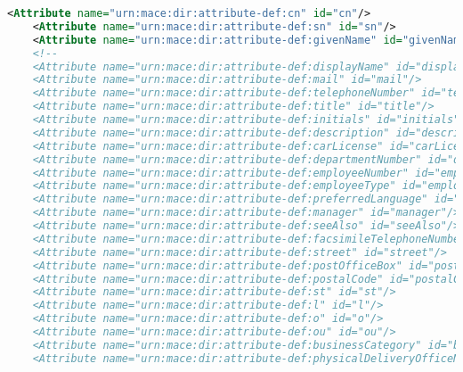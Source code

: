 \begin{lstlisting}[language=xml]
    <Attribute name="urn:mace:dir:attribute-def:cn" id="cn"/>
    <Attribute name="urn:mace:dir:attribute-def:sn" id="sn"/>
    <Attribute name="urn:mace:dir:attribute-def:givenName" id="givenName"/>
    <!--
    <Attribute name="urn:mace:dir:attribute-def:displayName" id="displayName"/>
    <Attribute name="urn:mace:dir:attribute-def:mail" id="mail"/>
    <Attribute name="urn:mace:dir:attribute-def:telephoneNumber" id="telephoneNumber"/>
    <Attribute name="urn:mace:dir:attribute-def:title" id="title"/>
    <Attribute name="urn:mace:dir:attribute-def:initials" id="initials"/>
    <Attribute name="urn:mace:dir:attribute-def:description" id="description"/>
    <Attribute name="urn:mace:dir:attribute-def:carLicense" id="carLicense"/>
    <Attribute name="urn:mace:dir:attribute-def:departmentNumber" id="departmentNumber"/>
    <Attribute name="urn:mace:dir:attribute-def:employeeNumber" id="employeeNumber"/>
    <Attribute name="urn:mace:dir:attribute-def:employeeType" id="employeeType"/>
    <Attribute name="urn:mace:dir:attribute-def:preferredLanguage" id="preferredLanguage"/>
    <Attribute name="urn:mace:dir:attribute-def:manager" id="manager"/>
    <Attribute name="urn:mace:dir:attribute-def:seeAlso" id="seeAlso"/>
    <Attribute name="urn:mace:dir:attribute-def:facsimileTelephoneNumber" id="facsimileTelephoneNumber"/>
    <Attribute name="urn:mace:dir:attribute-def:street" id="street"/>
    <Attribute name="urn:mace:dir:attribute-def:postOfficeBox" id="postOfficeBox"/>
    <Attribute name="urn:mace:dir:attribute-def:postalCode" id="postalCode"/>
    <Attribute name="urn:mace:dir:attribute-def:st" id="st"/>
    <Attribute name="urn:mace:dir:attribute-def:l" id="l"/>
    <Attribute name="urn:mace:dir:attribute-def:o" id="o"/>
    <Attribute name="urn:mace:dir:attribute-def:ou" id="ou"/>
    <Attribute name="urn:mace:dir:attribute-def:businessCategory" id="businessCategory"/>
    <Attribute name="urn:mace:dir:attribute-def:physicalDeliveryOfficeName" id="physicalDeliveryOfficeName"/>


\end{lstlisting}
